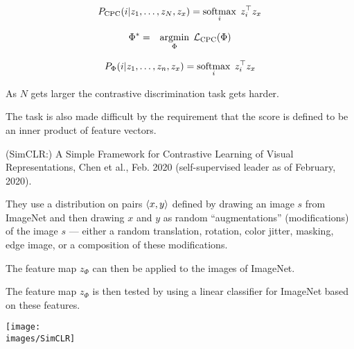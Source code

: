 {\vfill
$$P_\mathrm{CPC}(i|z_1,\ldots,z_N,z_x) = \operatorname*{softmax}_i\;z_i^\top z_x$$


\begin{eqnarray*}
\Phi^*  & = & \operatorname*{argmin}_\Phi\;{\cal L}_\mathrm{CPC}(\Phi)
\end{eqnarray*}

\vfill
$$P_\Phi(i|z_1,\ldots,z_n,z_x) = \operatorname*{softmax}_i\;z_i^\top z_x$$

\vfill
As $N$ gets larger the contrastive discrimination task gets harder.

\vfill
The task is also made difficult by the requirement that the score is defined to be an inner product of feature vectors.


(SimCLR:) A Simple Framework for Contrastive Learning of Visual Representations, Chen et al., Feb. 2020 (self-supervised leader as of February, 2020).

\vfill
They use a distribution on pairs ${\mbox{$\langle x,y\rangle$}}$ defined by drawing an image $s$ from ImageNet and then drawing $x$ and $y$ as random ``augmentations'' (modifications) of the image $s$
--- either a random translation, rotation, color jitter, masking, edge image, or a composition of these modifications.


The feature map $z_\Phi$ can then be applied to the images of ImageNet.

\vfill
The feature map $z_\Phi$ is then tested by using a {\color{red} linear} classifier for ImageNet based on these features.


\centerline{\texttt{[image: \\images/SimCLR]}}


}

